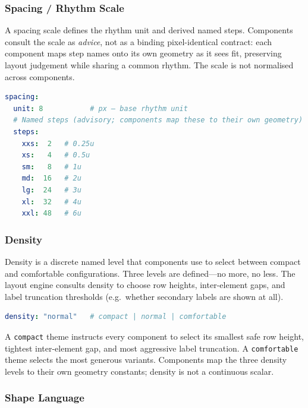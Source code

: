 \subsubsection{Spacing / Rhythm Scale}
\label{sec:contract-spacing}

A spacing scale defines the rhythm unit and derived named steps. Components consult the
scale as \emph{advice}, not as a binding pixel-identical contract: each component maps
step names onto its own geometry as it sees fit, preserving layout judgement while sharing
a common rhythm. The scale is not normalised across components.

\begin{lstlisting}[language=yaml,caption={General theme contract: spacing block (advisory)}]
spacing:
  unit: 8           # px — base rhythm unit
  # Named steps (advisory; components map these to their own geometry)
  steps:
    xxs:  2   # 0.25u
    xs:   4   # 0.5u
    sm:   8   # 1u
    md:  16   # 2u
    lg:  24   # 3u
    xl:  32   # 4u
    xxl: 48   # 6u
\end{lstlisting}

\subsubsection{Density}
\label{sec:contract-density}

Density is a discrete named level that components use to select between compact and
comfortable configurations. Three levels are defined---no more, no less. The layout engine
consults density to choose row heights, inter-element gaps, and label truncation thresholds
(e.g.\ whether secondary labels are shown at all).

\begin{lstlisting}[language=yaml,caption={General theme contract: density (decided)}]
density: "normal"   # compact | normal | comfortable
\end{lstlisting}

A \texttt{compact} theme instructs every component to select its smallest safe row height,
tightest inter-element gap, and most aggressive label truncation. A \texttt{comfortable}
theme selects the most generous variants. Components map the three density levels to their
own geometry constants; density is not a continuous scalar.

\subsubsection{Shape Language}
\label{sec:contract-shape}

